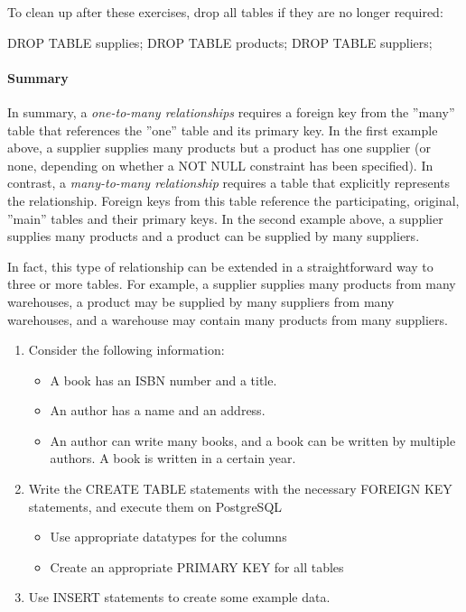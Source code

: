 \noindent To clean up after these exercises, drop all tables if they are no longer required:

\begin{sqlcode}
DROP TABLE supplies;
DROP TABLE products;
DROP TABLE suppliers;
\end{sqlcode}

\paragraph*{Summary} In summary, a \emph{one-to-many relationships} requires a foreign key from the ''many'' table that references the ''one'' table and its primary key. In the first example above, a supplier supplies many products but a product has one supplier (or none, depending on whether a NOT NULL constraint has been specified). In contrast, a \emph{many-to-many relationship} requires a table that explicitly represents the relationship. Foreign keys from this table reference the participating, original, ''main'' tables and their primary keys. In the second example above, a supplier supplies many products and a product can be supplied by many suppliers. 

In fact, this type of relationship can be extended in a straightforward way to three or more tables. For example, a supplier supplies many products from many warehouses, a product may be supplied by many suppliers from many warehouses, and a warehouse may contain many products from many suppliers. 

\begin{exerciseboxpaper}
\begin{enumerate}
  \item Consider the following information:
	\begin{itemize}
	  \item A book has an ISBN number and a title. 
	  \item An author has a name and an address. 
	  \item An author can write many books, and a book can be written by multiple authors. A book is written in a certain year.
	\end{itemize}
  \item Write the CREATE TABLE statements with the necessary FOREIGN KEY statements, and execute them on PostgreSQL
  \begin{itemize}
    \item Use appropriate datatypes for the columns
    \item Create an appropriate PRIMARY KEY for all tables
  \end{itemize}
  \item Use INSERT statements to create some example data.
\end{enumerate}
\end{exerciseboxpaper}

